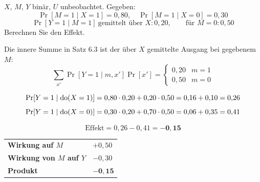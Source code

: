 \begin{aufgabe}
$X$, $M$, $Y$ binär, $U$ unbeobachtet. Gegeben:
\[ \Pr[M=1\mid X=1] = 0{,}80, \quad \Pr[M=1\mid X=0] = 0{,}30 \]
\[ \Pr[Y=1\mid M=1] \ \text{gemittelt über } X: 0{,}20, \qquad \text{für } M=0: 0{,}50 \]
Berechnen Sie den Effekt.

\loesung
{}
Die innere Summe in Satz 6.3 ist der über $X$ gemittelte Ausgang bei gegebenem $M$:
\[ \sum_{x'}\Pr[Y=1\mid m,x']\Pr[x'] = \begin{cases} 0{,}20 & m=1\\ 0{,}50 & m=0\end{cases} \]

\[ \Pr[Y=1\mid\operatorname{do}(X=1)] = 0{,}80\cdot0{,}20 + 0{,}20\cdot0{,}50 = 0{,}16+0{,}10 = 0{,}26 \]
\[ \Pr[Y=1\mid\operatorname{do}(X=0)] = 0{,}30\cdot0{,}20 + 0{,}70\cdot0{,}50 = 0{,}06+0{,}35 = 0{,}41 \]

\[ \text{Effekt} = 0{,}26 - 0{,}41 = \mathbf{-0{,}15} \]

\begin{center}
{\small
\renewcommand{\arraystretch}{1.48}
\begin{tabular}{@{}P{3.0cm}P{2.4cm}@{}}
\toprule
\textbf{Wirkung auf $M$} & $+0{,}50$\\
\textbf{Wirkung von $M$ auf $Y$} & $-0{,}30$\\
\midrule
\textbf{Produkt} & $\mathbf{-0{,}15}$\\
\bottomrule
\end{tabular}}
\end{center}

\begin{center}
\begin{minipage}{0.88\textwidth}
\end{minipage}
\end{center}
\end{aufgabe}

